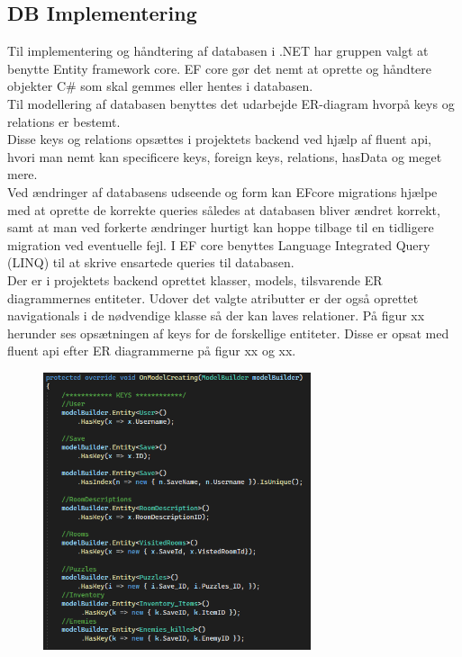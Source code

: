\subsection{DB Implementering}

Til implementering og håndtering af databasen i .NET har gruppen valgt at benytte Entity framework core.
EF core gør det nemt at oprette og håndtere objekter C\# som skal gemmes eller hentes i databasen.\\
Til modellering af databasen benyttes det udarbejde ER-diagram hvorpå keys og relations er bestemt.\\
Disse keys og relations opsættes i projektets backend ved hjælp af fluent api, hvori man nemt kan specificere keys, foreign keys, relations, hasData og meget mere.\\
Ved ændringer af databasens udseende og form kan EFcore migrations hjælpe med at oprette de korrekte queries således at databasen bliver ændret korrekt, samt at man ved forkerte ændringer hurtigt kan hoppe tilbage til en tidligere migration ved eventuelle fejl. I EF core benyttes Language Integrated Query (LINQ) til at skrive ensartede queries til databasen.\\

Der er i projektets backend oprettet klasser, models, tilsvarende ER diagrammernes entiteter. Udover det valgte atributter er der også oprettet navigationals i de nødvendige klasse så der kan laves relationer.
På figur xx herunder ses opsætningen af keys for de forskellige entiteter. Disse er opsat med fluent api efter ER diagrammerne på figur xx og xx.\\

\begin{figure}[H]
\centering
\includegraphics[width = 0.7\textwidth]{02-Body/Images/DAL-Database/DbKeys.PNG}
\caption{}
\label{fig:DbKeys}
\end{figure}

